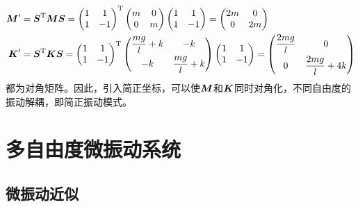 \begin{align*}
	\boldsymbol{M}' & = \boldsymbol{S}^{\mathrm{T}} \boldsymbol{M} \boldsymbol{S} = \begin{pmatrix} 1 & 1 \\ 1 & -1 \end{pmatrix}^{\mathrm{T}} \begin{pmatrix} m & 0 \\ 0 & m \end{pmatrix} \begin{pmatrix} 1 & 1 \\ 1 & -1 \end{pmatrix} = \begin{pmatrix} 2m & 0 \\ 0 & 2m \end{pmatrix} \\
	\boldsymbol{K}' & = \boldsymbol{S}^{\mathrm{T}} \boldsymbol{K} \boldsymbol{S} = \begin{pmatrix} 1 & 1 \\ 1 & -1 \end{pmatrix}^{\mathrm{T}} \begin{pmatrix} \dfrac{mg}{l}+k & -k \\[1.5ex] -k & \dfrac{mg}{l}+k \end{pmatrix} \begin{pmatrix} 1 & 1 \\ 1 & -1 \end{pmatrix} = \begin{pmatrix} \dfrac{2mg}{l} & 0 \\[1.5ex] 0 & \dfrac{2mg}{l}+4k \end{pmatrix}
\end{align*}
都为对角矩阵。因此，引入简正坐标，可以使$\boldsymbol{M}$和$\boldsymbol{K}$同时对角化，不同自由度的振动解耦，即简正振动模式。

\section{多自由度微振动系统}

\subsection{微振动近似}


